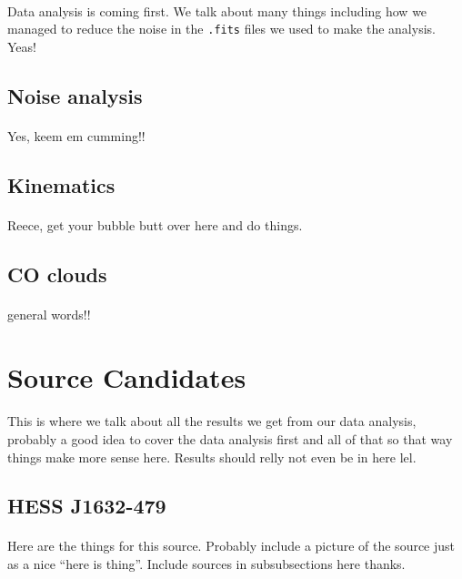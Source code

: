 \documentclass[a4paper, titlepage, oneside]{article}
\begin{document}
\begin{multicols}{2}
\paragraph{}
Data analysis is coming first. We talk about many things including how we managed to reduce the noise in the \texttt{.fits} files we used to make the analysis. Yeas!

\subsection{Noise analysis}
\paragraph{}
Yes, keem em cumming!!

\subsection{Kinematics}
\paragraph{}
Reece, get your bubble butt over here and do things.

\subsection{CO clouds}
\paragraph{}
general words!!

\section{Source Candidates}
\paragraph{}
This is where we talk about all the results we get from our data analysis, probably a good idea to cover the data analysis first and all of that so that way things make more sense here. Results should relly not even be in here lel.

\subsection{HESS J1632-479}
\paragraph{}
Here are the things for this source. Probably include a picture of the source just as a nice ``here is thing''. Include sources in subsubsections here thanks.


\end{multicols}
\end{document}
